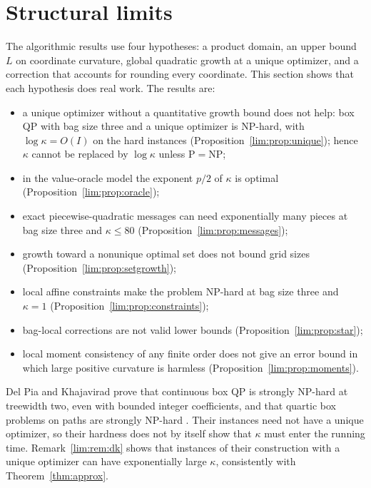 
\section{Structural limits}\label{sec:limits}

The algorithmic results use four hypotheses: a product domain, an upper
bound $L$ on coordinate curvature, global quadratic growth at a unique
optimizer, and a correction that accounts for rounding every coordinate.
This section shows that each hypothesis does real work. The results are:
\begin{itemize}
\item a unique optimizer without a quantitative growth bound does not help:
  box QP with bag size three and a unique optimizer is NP-hard, with
  $\log\kappa=O(I)$ on the hard instances
  (Proposition~\ref{lim:prop:unique}); hence $\kappa$ cannot be replaced
  by $\log\kappa$ unless $\mathrm P=\mathrm{NP}$;
\item in the value-oracle model the exponent $p/2$ of $\kappa$ is optimal
  (Proposition~\ref{lim:prop:oracle});
\item exact piecewise-quadratic messages can need exponentially many pieces
  at bag size three and $\kappa\le80$ (Proposition~\ref{lim:prop:messages});
\item growth toward a nonunique optimal set does not bound grid sizes
  (Proposition~\ref{lim:prop:setgrowth});
\item local affine constraints make the problem NP-hard at bag size three
  and $\kappa=1$ (Proposition~\ref{lim:prop:constraints});
\item bag-local corrections are not valid lower bounds
  (Proposition~\ref{lim:prop:star});
\item local moment consistency of any finite order does not give an error
  bound in which large positive curvature is harmless
  (Proposition~\ref{lim:prop:moments}).
\end{itemize}
Del Pia and Khajavirad prove that continuous box QP is strongly NP-hard at
treewidth two, even with bounded integer coefficients, and that quartic
box problems on paths are strongly NP-hard \cite{DelPiaKhajavirad2026}.
Their instances need not have a unique optimizer, so their hardness does
not by itself show that $\kappa$ must enter the running time.
Remark~\ref{lim:rem:dk} shows that instances of their construction with a
unique optimizer can have exponentially large $\kappa$, consistently with
Theorem~\ref{thm:approx}.

